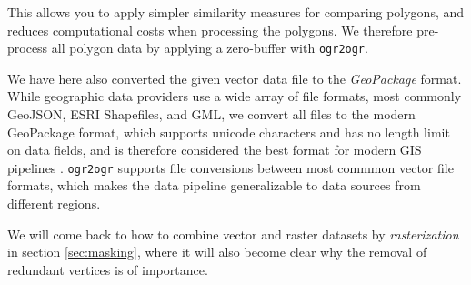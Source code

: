 This allows you to apply simpler similarity measures for comparing polygons, and reduces computational costs when processing the polygons.
We therefore pre-process all polygon data by applying a zero-buffer with \texttt{ogr2ogr}.


We have here also converted the given vector data file to the \textit{GeoPackage} format.
While geographic data providers use a wide array of file formats, most commonly GeoJSON, ESRI Shapefiles, and GML, we convert all files to the modern GeoPackage format, which supports unicode characters and has no length limit on data fields, and is therefore considered the best format for modern GIS pipelines \cite{hame_shapefile_2019}.
\texttt{ogr2ogr} supports file conversions between most commmon vector file formats, which makes the data pipeline generalizable to data sources from different regions.

We will come back to how to combine vector and raster datasets by \textit{rasterization} in section \ref{sec:masking}, where it will also become clear why the removal of redundant vertices is of importance.
